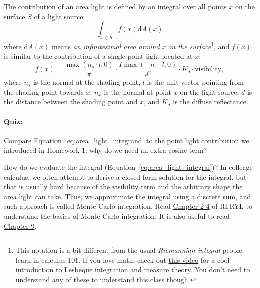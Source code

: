 The contribution of an area light is defined by an integral over all points $x$ on the surface $S$ of a light source:
\begin{equation}
	\int_{x \in S} f(x) \mathrm{d}A(x)
	\label{eq:area_light_integral}
\end{equation}
where $\mathrm{d}A(x)$ means \emph{an infinitesimal area around x on the surface}\footnote{This notation is a bit different from the usual \emph{Riemannian integral} people learn in calculus 101. If you love math, check out \href{https://www.youtube.com/watch?v=LDNDTOVnKJk}{this video} for a cool introduction to Lesbeque integration and measure theory. You don't need to understand any of these to understand this class though.}, and $f(x)$ is similar to the contribution of a single point light located at $x$:
\begin{equation}
    f(x) = \frac{\max\left(n_s \cdot l, 0\right)}{\pi} \cdot \frac{I \max\left(-n_x \cdot l, 0\right)}{d^2} \cdot K_d \cdot \text{visibility},
    \label{eq:area_light_integrand}
\end{equation}
where $n_s$ is the normal at the shading point, $l$ is the unit vector pointing from the shading point towards $x$, $n_x$ is the normal at point $x$ on the light source, $d$ is the distance between the shading point and $x$, and $K_d$ is the diffuse reflectance.

\paragraph{Quiz:} Compare Equation~\eqref{eq:area_light_integrand} to the point light contribution we introduced in Homework 1: why do we need an extra cosine term?

How do we evaluate the integral (Equation~\eqref{eq:area_light_integral})? In colleage calculus, we often attempt to derive a closed-form solution for the integral, but that is usually hard because of the visibility term and the arbitrary shape the area light can take. Thus, we approximate the integral using a discrete sum, and such approach is called Monte Carlo integration. Read \href{https://raytracing.github.io/books/RayTracingTheRestOfYourLife.html#asimplemontecarloprogram}{Chapter 2-4} of RTRYL to understand the basics of Monte Carlo integration. It is also useful to read \href{https://raytracing.github.io/books/RayTracingTheRestOfYourLife.html#samplinglightsdirectly}{Chapter 9}.

